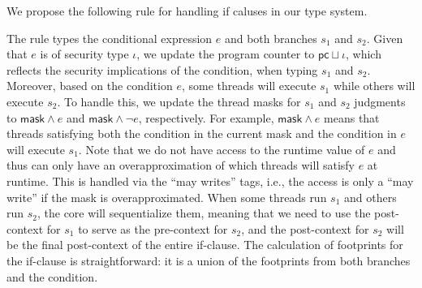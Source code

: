 We propose the following rule for handling if caluses in our type system. 
{\small\begin{mathpar}
    \end{mathpar}
    }
    The rule types the conditional expression $e$ and both branches $s_1$ and $s_2$. Given that $e$ is of security type $\iota$, we update the program counter to $\mathsf{pc} \sqcup \iota$, which reflects the security implications of the condition,  when typing $s_1$ and $s_2$. 
 Moreover, based on the condition $e$, some threads will execute $s_1$ while others will execute $s_2$. 
 To handle this, we update the thread masks for $s_1$ and $s_2$ judgments to $\mathsf{mask} \wedge e$ and $\mathsf{mask} \wedge \neg e$, respectively.
 For example,  $\mathsf{mask} \wedge e$ means that threads satisfying both the condition in the current mask and the condition in $e$ will execute $s_1$. 
 Note that we do not have access to the runtime value of $e$ and thus can only have an overapproximation of which threads will satisfy $e$ at runtime. This is handled via the ``may writes'' tags, i.e., the access is only a ``may write'' if the mask is overapproximated.
%
When some threads run $s_1$ and others run $s_2$, the core will sequentialize them, meaning that we need to use the post-context for $s_1$ to serve as the pre-context for $s_2$, and the post-context for $s_2$ will be the final post-context of the entire if-clause.
%
The calculation of footprints for the if-clause is straightforward: it is a union of the footprints from both branches and the condition.
  

